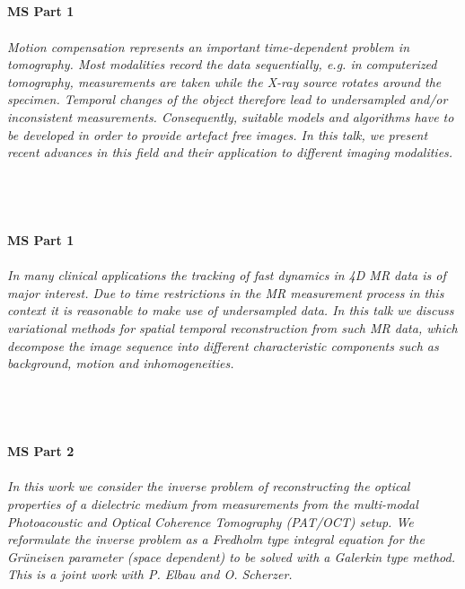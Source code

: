 \begin{multicols}{2}
\\ 
    \\
    \\\\
    \noindent\textbf{MS Part 1}\\
\\  
    \textit{Motion compensation represents an important time-dependent problem in tomography. Most modalities record the data sequentially, e.g. in computerized tomography, measurements are taken while the X-ray source rotates around the specimen. Temporal changes of the object therefore lead to undersampled and/or inconsistent measurements. Consequently, suitable models and algorithms have to be developed in order to provide artefact free images. In this talk, we present recent advances in this field and their application to different imaging modalities.}\\
\\ 
    \\
    \\\\
    \noindent\textbf{MS Part 1}\\
\\  
    \textit{In many clinical applications the tracking of fast dynamics in 4D MR data is of major interest. Due to time restrictions in the MR measurement process in this context it is reasonable to make use of undersampled data. In this talk we discuss variational methods for spatial temporal reconstruction from such MR data, which decompose the image sequence into different characteristic components such as background, motion and inhomogeneities. }\\
\\ 
    \\
    \\\\
    \noindent\textbf{MS Part 2}\\
\\  
    \textit{In this work we consider the inverse problem of reconstructing the optical properties of a dielectric medium from measurements from the multi-modal Photoacoustic and Optical Coherence Tomography (PAT/OCT) setup.  We reformulate the inverse problem as a Fredholm type integral equation for the Grüneisen parameter (space dependent) to be solved with a Galerkin type method. 
This is a joint work with P. Elbau and O. Scherzer.  }\\

\end{multicols}
